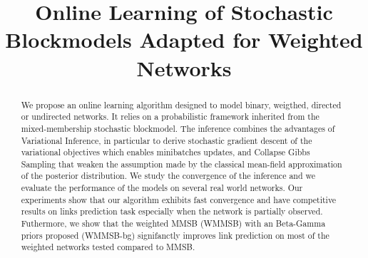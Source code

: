 \documentclass{article}
\begin{document}
\title{Online Learning of Stochastic Blockmodels Adapted for Weighted Networks}
	
\maketitle

\begin{abstract}
We propose an online learning algorithm designed to model binary, weigthed, directed or undirected networks. It relies on a probabilistic framework inherited from the mixed-membership stochastic blockmodel. The inference combines the advantages of Variational Inference, in particular to derive stochastic gradient descent of the variational objectives which enables minibatches updates, and Collapse Gibbs Sampling that weaken the assumption made by the classical mean-field approximation of the posterior distribution. We study the convergence of the inference and we evaluate the performance of the models on several real world networks. Our experiments show that our algorithm exhibits fast convergence and have competitive  results on links prediction task especially when the network is partially observed. Futhermore, we show that the weighted MMSB (WMMSB) with an Beta-Gamma priors proposed (WMMSB-bg) signifanctly improves link prediction on most of the weighted networks tested compared to MMSB.
\end{abstract}



%




\clearpage

%



\clearpage
\appendix

\end{document}
